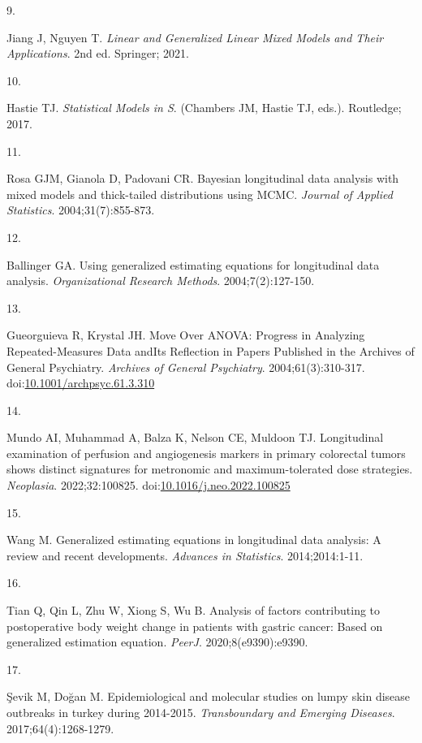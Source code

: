 \documentclass[
]{article}
\newlength{\cslhangindent}
\newlength{\csllabelwidth}
\newlength{\cslentryspacingunit} %
\newenvironment{CSLReferences}[2] %
 {%
  \setlength{\parindent}{0pt}
  \ifodd #1
  \let\oldpar\par
  \def\par{\hangindent=\cslhangindent\oldpar}
  \fi
  \setlength{\parskip}{#2\cslentryspacingunit}
 }%
 {}
\newcommand{\CSLLeftMargin}[1]{\parbox[t]{\csllabelwidth}{#1}}
\newcommand{\CSLRightInline}[1]{\parbox[t]{\linewidth - \csllabelwidth}{#1}\break}
\begin{document}
\begin{CSLReferences}{0}{0}
\leavevmode{}%
\CSLLeftMargin{9. }%
\CSLRightInline{Jiang J, Nguyen T. \emph{Linear and Generalized Linear
Mixed Models and Their Applications}. 2nd ed. Springer; 2021.}

\leavevmode{}%
\CSLLeftMargin{10. }%
\CSLRightInline{Hastie TJ. \emph{Statistical Models in {S}}. (Chambers
JM, Hastie TJ, eds.). Routledge; 2017.}

\leavevmode{}%
\CSLLeftMargin{11. }%
\CSLRightInline{Rosa GJM, Gianola D, Padovani CR. Bayesian longitudinal
data analysis with mixed models and thick-tailed distributions using
{MCMC}. \emph{Journal of Applied Statistics}. 2004;31(7):855-873.}

\leavevmode{}%
\CSLLeftMargin{12. }%
\CSLRightInline{Ballinger GA. Using generalized estimating equations for
longitudinal data analysis. \emph{Organizational Research Methods}.
2004;7(2):127-150.}

\leavevmode{}%
\CSLLeftMargin{13. }%
\CSLRightInline{Gueorguieva R, Krystal JH. {Move Over ANOVA: Progress in
Analyzing Repeated-Measures Data andIts Reflection in Papers Published
in the Archives of General Psychiatry}. \emph{Archives of General
Psychiatry}. 2004;61(3):310-317.
doi:\href{https://doi.org/10.1001/archpsyc.61.3.310}{10.1001/archpsyc.61.3.310}}

\leavevmode{}%
\CSLLeftMargin{14. }%
\CSLRightInline{Mundo AI, Muhammad A, Balza K, Nelson CE, Muldoon TJ.
Longitudinal examination of perfusion and angiogenesis markers in
primary colorectal tumors shows distinct signatures for metronomic and
maximum-tolerated dose strategies. \emph{Neoplasia}. 2022;32:100825.
doi:\href{https://doi.org/10.1016/j.neo.2022.100825}{10.1016/j.neo.2022.100825}}

\leavevmode{}%
\CSLLeftMargin{15. }%
\CSLRightInline{Wang M. Generalized estimating equations in longitudinal
data analysis: A review and recent developments. \emph{Advances in
Statistics}. 2014;2014:1-11.}

\leavevmode{}%
\CSLLeftMargin{16. }%
\CSLRightInline{Tian Q, Qin L, Zhu W, Xiong S, Wu B. Analysis of factors
contributing to postoperative body weight change in patients with
gastric cancer: Based on generalized estimation equation. \emph{PeerJ}.
2020;8(e9390):e9390.}

\leavevmode{}%
\CSLLeftMargin{17. }%
\CSLRightInline{Şevik M, Doğan M. Epidemiological and molecular studies
on lumpy skin disease outbreaks in turkey during 2014-2015.
\emph{Transboundary and Emerging Diseases}. 2017;64(4):1268-1279.}

\end{CSLReferences}
\end{document}
